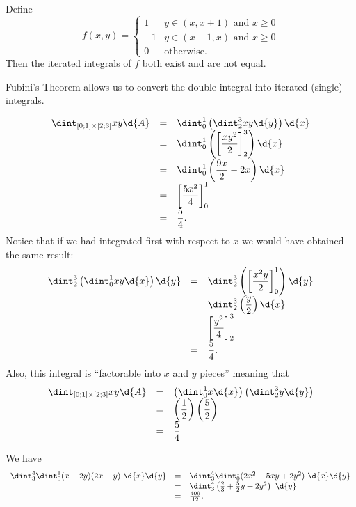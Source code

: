   \begin{example}
    Define
    \begin{equation*}
      f(x, y) = \begin{cases}
	1 & y \in (x, x+1) \text{ and } x \geq 0\\
	-1 & y \in (x-1, x) \text{ and } x \geq 0\\
	0 & \text{otherwise}.
      \end{cases}
    \end{equation*}
    Then the iterated integrals of $f$ both exist and are not equal.
  \end{example}
  Fubini's Theorem allows us to convert the double integral into
iterated (single) integrals.
\begin{exa}
$$\begin{array}{lll}
\dint _{[0; 1]\times [2; 3]} xy \d{A} & = &
\dint _0 ^1 \left(\dint _2 ^3 xy \d{y}\right)\d{x}\\
& = & \dint _0 ^1 \left(\left[\dfrac{xy^2}{2}\right]_2 ^3\right)
\d{x}\\
& = & \dint _0 ^1 \left(\dfrac{9x}{2} - 2x \right) \d{x}\\
& = & \left[ \dfrac{5x^2}{4} \right] _0 ^1 \\
& = & \dfrac{5}{4}.
\end{array}$$
Notice that if we had integrated first with respect to $x$ we
would have obtained the same result:
$$\begin{array}{lll}
\dint _2 ^3 \left(\dint _0 ^1 xy \d{x}\right)\d{y}& = & \dint _2 ^3
\left(\left[\dfrac{x^2y}{2}\right]_0 ^1\right)
\d{y}\\
& = & \dint _2 ^3 \left(\dfrac{y}{2} \right) \d{x}\\
& = & \left[ \dfrac{y^2}{4} \right] _2 ^3 \\
& = & \dfrac{5}{4}.
\end{array}$$
Also, this integral is ``factorable into $x$ and $y$ pieces''
meaning that
$$\begin{array}{lll}
\dint _{[0; 1]\times [2; 3]} xy \d{A} & = & \left(\dint _0 ^1
x\d{x}\right)\left(\dint _2 ^3 y\d{y}\right)
\\
& = & \left(\dfrac{1}{2}\right)\left(\dfrac{5}{2}\right) \\
& = & \dfrac{5}{4}
\end{array}$$



\end{exa}
\begin{exa}\label{exa:double_int_for_change1}
We have $$\begin{array}{lll}\dint _3 ^4  \dint_0 ^1 (x + 2y)(2x + y) \
\d{x} \d{y} & = & \dint _3 ^4 \dint _0 ^1 (2x^2+5xy+2y^2) \
\d{x}\d{y} \\
& = &  \dint_3 ^4 \left(\frac{2}{3}+\frac{5}{2}y+2y^2\right)  \ \d{y} \\
& = & \frac{409}{12}.
\end{array}$$
\end{exa}



